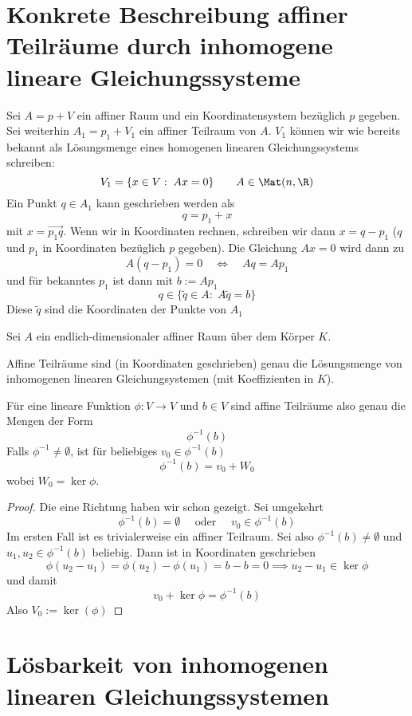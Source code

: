 \documentclass{mycourse}
\begin{document}
\section{Konkrete Beschreibung affiner Teilräume durch inhomogene lineare Gleichungssysteme}

Sei $A=p+V$ ein affiner Raum und ein Koordinatensystem bezüglich $p$ gegeben.
Sei weiterhin $A_1 = p_1 + V_1$ ein affiner Teilraum von $A$.
$V_1$ können wir wie bereits bekannt als Lösungsmenge eines homogenen linearen Gleichungssystems schreiben:
\[
	V_1 = \{x\in V:\; Ax = 0\} \qquad A \in \Mat(n,\R)
\]
Ein Punkt $q\in A_1$ kann geschrieben werden als
\[
	q = p_1 + x
\]
mit $x=\vec{p_1q}$.
Wenn wir in Koordinaten rechnen, schreiben wir dann $x=q-p_1$ ($q$ und $p_1$ in Koordinaten bezüglich $p$ gegeben).
Die Gleichung $Ax=0$ wird dann zu
\[
	A(q-p_1)=0 \quad \iff \quad Aq =Ap_1
\]
und für bekanntes $p_1$ ist dann mit $b:=Ap_1$
\[
	q\in \{\tilde q\in A:\; A\tilde q = b\}
\]
Diese $\tilde q$ sind die Koordinaten der Punkte von $A_1$

\begin{kor} \label{kor:8.12}
	Sei $A$ ein endlich-dimensionaler affiner Raum über dem Körper $K$.

	Affine Teilräume sind (in Koordinaten geschrieben) genau die Lösungsmenge von inhomogenen linearen Gleichungsystemen (mit Koeffizienten in $K$).
	
	Für eine lineare Funktion $\phi:V\to V$ und $b\in V$ sind affine Teilräume also genau die Mengen der Form 
	\[
		\phi^{-1}(b)
	\]
	Falls $\phi^{-1}\neq\emptyset$, ist für beliebiges $v_0\in \phi^{-1}(b)$
	\[
		\phi^{-1}(b)=v_0+W_0
	\]
	wobei $W_0=\ker\phi$.
\begin{proof}
	Die eine Richtung haben wir schon gezeigt. 
	Sei umgekehrt
\[ 
	\phi^{-1}(b)=\emptyset \quad\text{ oder }\quad v_0\in \phi^{-1}(b)
\]
Im ersten Fall ist es trivialerweise ein affiner Teilraum.
Sei also $\phi^{-1}(b)\neq \emptyset$ und $u_1,u_2\in \phi^{-1}(b)$ beliebig.
Dann ist in Koordinaten geschrieben
\[
	\phi(u_2 - u_1) = \phi(u_2) - \phi(u_1) = b - b = 0 \implies u_2 - u_1 \in \ker\phi
\]
und damit
\[
	v_0 + \ker\phi = \phi^{-1}(b)
\]
Also $V_0:=\ker(\phi)$
\end{proof}
\end{kor}

\section{Lösbarkeit von inhomogenen linearen Gleichungssystemen}
\end{document}
